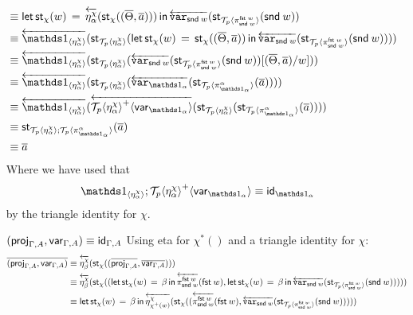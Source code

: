 \documentclass[10pt]{article}
\theoremstyle{definition}
\newcommand\dsd[1]{\ensuremath{\mathsf{#1}}}
\newcommand{\app}[2]{\ensuremath{#1 \: #2}}
\newcommand{\fst}[1]{\app{\dsd{fst}}{#1}}
\newcommand{\snd}[1]{\app{\dsd{snd}}{#1}}
\newcommand{\id}{\mathsf{id}}
\newcommand{\rewrite}[2]{\overleftarrow{#1}(#2)}
\newcommand\St[2]{\ensuremath{{#1}^*(#2)}}
\newcommand\StI[2]{\ensuremath{\mathsf{st}_{#1}(#2)}}
\newcommand\StE[4]{\ensuremath{\mathsf{let} \, \StI{#1}{#3} \, = \, {#2} \, \mathsf{in} \, #4}}
\newcommand\TrPlus[2]{\ensuremath{{#1}^+(#2)}}
\newcommand\ApEl[2]{\mathcal{T}_{#1}\langle#2\rangle}
\newcommand\ApPlus[2]{\ensuremath{{#1}^+ \langle #2 \rangle }}
\begin{document}
\begin{enumerate}[style = multiline, labelwidth = 80pt]
\begin{align*}
&\equiv \StE{\chi}{\rewrite{\eta^\chi_{\alpha}}{\StI{\chi}{(\upstairs{\Theta}, \upstairs{a})}}}{w}{\rewrite{\var{\snd w}}{\StI{\ApEl{p}{\pi^{\fst w}_{\snd w}}}{\snd w}}} \\
&\equiv \rewrite{\One_{\langle \eta^\chi_\alpha \rangle}}{\StI{\ApEl{p}{\eta^\chi_\alpha}}{\StE{\chi}{\StI{\chi}{(\upstairs{\Theta}, \upstairs{a})}}{w}{\rewrite{\var{\snd w}}{\StI{\ApEl{p}{\pi^{\fst w}_{\snd w}}}{\snd w}}}}} \\
&\equiv \rewrite{\One_{\langle \eta^\chi_\alpha \rangle}}{\StI{\ApEl{p}{\eta^\chi_\alpha}}{\rewrite{\var{\snd w}}{\StI{\ApEl{p}{\pi^{\fst w}_{\snd w}}}{\snd w}}[(\upstairs{\Theta}, \upstairs{a})/w]}} \\
&\equiv \rewrite{\One_{\langle \eta^\chi_\alpha \rangle}}{\StI{\ApEl{p}{\eta^\chi_\alpha}}{\rewrite{\var{\One_\alpha}}{\StI{\ApEl{p}{\pi^{\alpha}_{\One_\alpha}}}{\upstairs{a}}}}} \\
&\equiv \rewrite{\One_{\langle \eta^\chi_\alpha \rangle}}{\rewrite{\ApPlus{\ApEl{p}{\eta^\chi_\alpha}}{\qvar{\One_\alpha}}}{\StI{\ApEl{p}{\eta^\chi_\alpha}}{\StI{\ApEl{p}{\pi^{\alpha}_{\One_\alpha}}}{\upstairs{a}}}}} \\
&\equiv \StI{\ApEl{p}{\eta^\chi_\alpha};\ApEl{p}{\pi^{\alpha}_{\One_\alpha}}}{\upstairs{a}} \\
&\equiv \upstairs{a}
\end{align*}
Where we have used that
\begin{align*}
\ApOne{\eta^\chi_\alpha};\ApPlus{\ApEl{p}{\eta^\chi_\alpha}}{\qvar{\One_\alpha}} \equiv \id_{\One_\alpha}
\end{align*}
by the triangle identity for $\chi$.
\item[{$(\proj{\Gamma,A}, \qvar{\Gamma,A}) \equiv \id_{\Gamma, A}$}] Using eta for $\St{\chi}{}$ and a triangle identity for $\chi$:
\begin{align*}
\upstairs{(\proj{\Gamma,A}, \qvar{\Gamma,A})}
&\equiv \rewrite{\eta^\chi_{\beta}}{\StI{\chi}{(\upstairs{\proj{\Gamma,A}}, \upstairs{\qvar{\Gamma,A}})}} \\
&\equiv \rewrite{\eta^\chi_{\beta}}{\StI{\chi}{(\StE{\chi}{\beta}{w}{\rewrite{\pi^{\fst w}_{\snd w}}{\fst w}}, \StE{\chi}{\beta}{w}{\rewrite{\var{\snd w}}{\StI{\ApEl{p}{\pi^{\fst w}_{\snd w}}}{\snd w}}})}} \\
&\equiv \StE{\chi}{\beta}{w}{\rewrite{\eta^\chi_{\TrPlus{\chi}{w}}}{\StI{\chi}{(\rewrite{\pi^{\fst w}_{\snd w}}{\fst w}, \rewrite{\var{\snd w}}{\StI{\ApEl{p}{\pi^{\fst w}_{\snd w}}}{\snd w}})}}} \\

\end{align*}
\end{enumerate}
\end{document}
